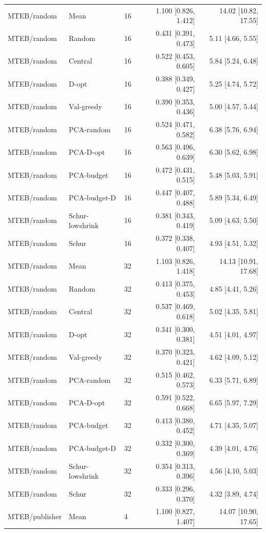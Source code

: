 \begin{longtable}{lllrr}
MTEB/random & Mean & 16 & 1.100 [0.826, 1.412] & 14.02 [10.82, 17.55]\\
MTEB/random & Random & 16 & 0.431 [0.391, 0.473] & 5.11 [4.66, 5.55]\\
MTEB/random & Central & 16 & 0.522 [0.453, 0.605] & 5.84 [5.24, 6.48]\\
MTEB/random & D-opt & 16 & 0.388 [0.349, 0.427] & 5.25 [4.74, 5.72]\\
MTEB/random & Val-greedy & 16 & 0.390 [0.353, 0.436] & 5.00 [4.57, 5.44]\\
MTEB/random & PCA-random & 16 & 0.524 [0.471, 0.582] & 6.38 [5.76, 6.94]\\
MTEB/random & PCA-D-opt & 16 & 0.563 [0.496, 0.639] & 6.30 [5.62, 6.98]\\
MTEB/random & PCA-budget & 16 & 0.472 [0.431, 0.515] & 5.48 [5.03, 5.91]\\
MTEB/random & PCA-budget-D & 16 & 0.447 [0.407, 0.488] & 5.89 [5.34, 6.49]\\
MTEB/random & Schur-lowshrink & 16 & 0.381 [0.343, 0.419] & 5.09 [4.63, 5.50]\\
MTEB/random & Schur & 16 & 0.372 [0.338, 0.407] & 4.93 [4.51, 5.32]\\
MTEB/random & Mean & 32 & 1.103 [0.826, 1.418] & 14.13 [10.91, 17.68]\\
MTEB/random & Random & 32 & 0.413 [0.375, 0.453] & 4.85 [4.41, 5.26]\\
MTEB/random & Central & 32 & 0.537 [0.469, 0.618] & 5.02 [4.35, 5.81]\\
MTEB/random & D-opt & 32 & 0.341 [0.300, 0.381] & 4.51 [4.01, 4.97]\\
MTEB/random & Val-greedy & 32 & 0.370 [0.323, 0.421] & 4.62 [4.09, 5.12]\\
MTEB/random & PCA-random & 32 & 0.515 [0.462, 0.573] & 6.33 [5.71, 6.89]\\
MTEB/random & PCA-D-opt & 32 & 0.591 [0.522, 0.668] & 6.65 [5.97, 7.29]\\
MTEB/random & PCA-budget & 32 & 0.413 [0.380, 0.452] & 4.71 [4.35, 5.07]\\
MTEB/random & PCA-budget-D & 32 & 0.332 [0.300, 0.369] & 4.39 [4.01, 4.76]\\
MTEB/random & Schur-lowshrink & 32 & 0.354 [0.313, 0.396] & 4.56 [4.10, 5.03]\\
MTEB/random & Schur & 32 & 0.333 [0.296, 0.370] & 4.32 [3.89, 4.74]\\
MTEB/publisher & Mean & 4 & 1.100 [0.827, 1.407] & 14.07 [10.90, 17.65]\\

\end{longtable}
